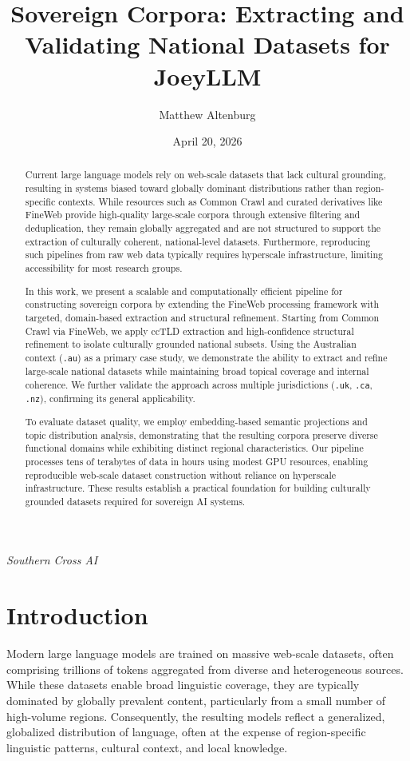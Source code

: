 \documentclass[11pt, a4paper]{article}
\title{Sovereign Corpora: Extracting and Validating National Datasets for JoeyLLM}
\author{Matthew Altenburg}
\date{April 20, 2026}
\makeatletter
\renewcommand{\maketitle}{
    \begin{center}
        {\LARGE\bfseries\color{navyblue} \@title \par}
        \vspace{1.5em}
        {\large \@author \par}
        \vspace{0.5em}
        {\small \textit{Southern Cross AI} \par}
        \vspace{0.8em}
        {\small \@date \par}
        \vspace{1.5em}
    \end{center}
}
\makeatother
\begin{document}
\maketitle

\begin{abstract}
Current large language models rely on web-scale datasets that lack cultural grounding, resulting in systems biased toward globally dominant distributions rather than region-specific contexts. While resources such as Common Crawl and curated derivatives like FineWeb provide high-quality large-scale corpora through extensive filtering and deduplication, they remain globally aggregated and are not structured to support the extraction of culturally coherent, national-level datasets. Furthermore, reproducing such pipelines from raw web data typically requires hyperscale infrastructure, limiting accessibility for most research groups.

In this work, we present a scalable and computationally efficient pipeline for constructing sovereign corpora by extending the FineWeb processing framework with targeted, domain-based extraction and structural refinement. Starting from Common Crawl via FineWeb, we apply ccTLD extraction and high-confidence structural refinement to isolate culturally grounded national subsets. Using the Australian context (\texttt{.au}) as a primary case study, we demonstrate the ability to extract and refine large-scale national datasets while maintaining broad topical coverage and internal coherence. We further validate the approach across multiple jurisdictions (\texttt{.uk}, \texttt{.ca}, \texttt{.nz}), confirming its general applicability.

To evaluate dataset quality, we employ embedding-based semantic projections and topic distribution analysis, demonstrating that the resulting corpora preserve diverse functional domains while exhibiting distinct regional characteristics. Our pipeline processes tens of terabytes of data in hours using modest GPU resources, enabling reproducible web-scale dataset construction without reliance on hyperscale infrastructure. These results establish a practical foundation for building culturally grounded datasets required for sovereign AI systems.
\end{abstract}

\section{Introduction}

Modern large language models are trained on massive web-scale datasets, often comprising trillions of tokens aggregated from diverse and heterogeneous sources. While these datasets enable broad linguistic coverage, they are typically dominated by globally prevalent content, particularly from a small number of high-volume regions. Consequently, the resulting models reflect a generalized, globalized distribution of language, often at the expense of region-specific linguistic patterns, cultural context, and local knowledge.
\end{document}

